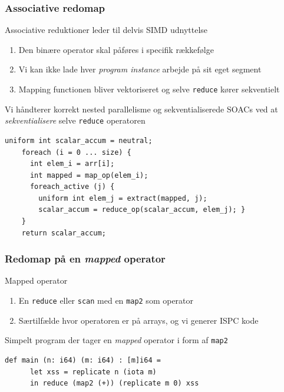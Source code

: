 \documentclass[t]{beamer}
\begin{document}
\begin{frame}[fragile]
  \frametitle{Associative redomap}
  \begin{block}{Associative reduktioner leder til delvis SIMD udnyttelse}
    \begin{enumerate}
    \item Den binære operator skal påføres i specifik rækkefølge
    \item Vi kan ikke lade hver \textit{program instance} arbejde på sit eget segment
    \item Mapping functionen bliver vektoriseret og selve \texttt{reduce} kører sekventielt
    \end{enumerate}
  \end{block}
  Vi håndterer korrekt nested parallelisme og sekventialiserede SOACs ved at \textit{sekventialisere} selve \texttt{reduce} operatoren
  \begin{lstlisting}[language=ispc]
    uniform int scalar_accum = neutral;
    foreach (i = 0 ... size) {
      int elem_i = arr[i];
      int mapped = map_op(elem_i);
      foreach_active (j) {
        uniform int elem_j = extract(mapped, j);
        scalar_accum = reduce_op(scalar_accum, elem_j); }
    }
    return scalar_accum;
  \end{lstlisting}

\end{frame}

\begin{frame}[fragile]
  \frametitle{Redomap på en \textit{mapped} operator}
  \begin{block}{Mapped operator}
    \begin{enumerate}
    \item En \texttt{reduce} eller \texttt{scan} med en \texttt{map2} som operator
    \item Særtilfælde hvor operatoren er på arrays, og vi generer ISPC kode
    \end{enumerate}
  \end{block}
  Simpelt program der tager en \textit{mapped} operator i form af \texttt{map2}
  \begin{lstlisting}[language=futhark]
    def main (n: i64) (m: i64) : [m]i64 =
      let xss = replicate n (iota m)
      in reduce (map2 (+)) (replicate m 0) xss
    \end{lstlisting}
\end{frame}
\end{document}
